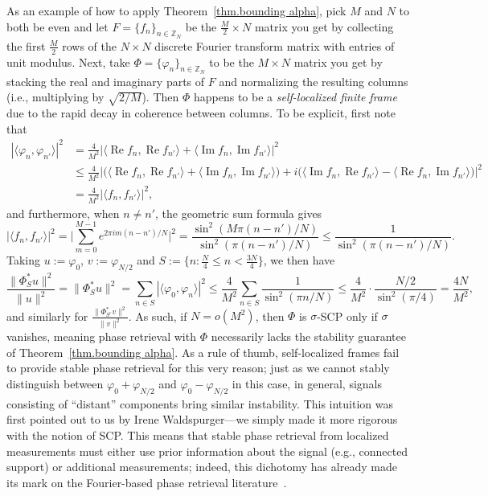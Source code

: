 \documentclass[times,10pt]{elsarticle}
\theoremstyle{plain}
\begin{document}
As an example of how to apply Theorem~\ref{thm.bounding alpha}, pick $M$ and $N$ to both be even and let $F=\{f_n\}_{n\in\mathbb{Z}_N}$ be the $\frac{M}{2}\times N$ matrix you get by collecting the first $\frac{M}{2}$ rows of the $N\times N$ discrete Fourier transform matrix with entries of unit modulus.
Next, take $\Phi=\{\varphi_n\}_{n\in\mathbb{Z}_N}$ to be the $M\times N$ matrix you get by stacking the real and imaginary parts of $F$ and normalizing the resulting columns (i.e., multiplying by $\sqrt{2/M}$).
Then $\Phi$ happens to be a \textit{self-localized finite frame} due to the rapid decay in coherence between columns.
To be explicit, first note that 
\begin{align*}
|\langle \varphi_n,\varphi_{n'}\rangle|^2
&=\tfrac{4}{M^2}|\langle \operatorname{Re}f_n,\operatorname{Re}f_{n'}\rangle+\langle \operatorname{Im}f_n,\operatorname{Im}f_{n'}\rangle|^2\\
&\leq\tfrac{4}{M^2}\Big|\Big(\langle \operatorname{Re}f_n,\operatorname{Re}f_{n'}\rangle+\langle \operatorname{Im}f_n,\operatorname{Im}f_{n'}\rangle\Big)+i\Big(\langle \operatorname{Im}f_n,\operatorname{Re}f_{n'}\rangle-\langle \operatorname{Re}f_n,\operatorname{Im}f_{n'}\rangle\Big)\Big|^2\\
&=\tfrac{4}{M^2}|\langle f_n,f_{n'}\rangle|^2,
\end{align*}
and furthermore, when $n\neq n'$, the geometric sum formula gives
\begin{equation*}
|\langle f_n,f_{n'}\rangle|^2
=\bigg|\sum_{m=0}^{M-1}e^{2\pi im(n-n')/N}\bigg|^2
=\frac{\sin^2(M\pi(n-n')/N)}{\sin^2(\pi(n-n')/N)}
\leq\frac{1}{\sin^2(\pi(n-n')/N)}.
\end{equation*}
Taking $u:=\varphi_0$, $v:=\varphi_{N/2}$ and $S:=\{n:\frac{N}{4}\leq n<\frac{3N}{4}\}$, we then have
\begin{equation*}
\frac{\|\Phi_S^*u\|^2}{\|u\|^2}
=\|\Phi_S^*u\|^2
=\sum_{n\in S}|\langle\varphi_0,\varphi_n\rangle|^2
\leq\frac{4}{M^2}\sum_{n\in S}\frac{1}{\sin^2(\pi n/N)}
\leq\frac{4}{M^2}\cdot\frac{N/2}{\sin^2(\pi/4)}
=\frac{4N}{M^2},
\end{equation*}
and similarly for $\frac{\|\Phi_{S^\mathrm{c}}^*v\|^2}{\|v\|^2}$.
As such, if $N=o(M^2)$, then $\Phi$ is $\sigma$-SCP only if $\sigma$ vanishes, meaning phase retrieval with $\Phi$ necessarily lacks the stability guarantee of Theorem~\ref{thm.bounding alpha}.
As a rule of thumb, self-localized frames fail to provide stable phase retrieval for this very reason; just as we cannot stably distinguish between $\varphi_0+\varphi_{N/2}$ and $\varphi_0-\varphi_{N/2}$ in this case, in general, signals consisting of ``distant'' components bring similar instability.
This intuition was first pointed out to us by Irene Waldspurger---we simply made it more rigorous with the notion of SCP.
This means that stable phase retrieval from localized measurements must either use prior information about the signal (e.g., connected support) or additional measurements; indeed, this dichotomy has already made its mark on the Fourier-based phase retrieval literature~\cite{Fannjiang:12,JaganathanOH:12}.
\end{document}
